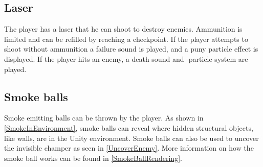 \subsection{Laser}
The player has a laser that he can shoot to destroy enemies. Ammunition is limited and can be refilled by reaching a checkpoint. If the player attempts to shoot without ammunition a failure sound is played, and a puny particle effect is displayed. If the player hits an enemy, a death sound and -particle-system are played.



\subsection{Smoke balls}
Smoke emitting  balls can be thrown by the player. As shown in \cref{SmokeInEnvironment}, smoke balls can reveal where hidden structural objects, like walls, are in the Unity environment. Smoke balls can also be used to uncover the invisible champer as seen in \cref{UncoverEnemy}. More information on how the smoke ball works can be found in \cref{SmokeBallRendering}.

